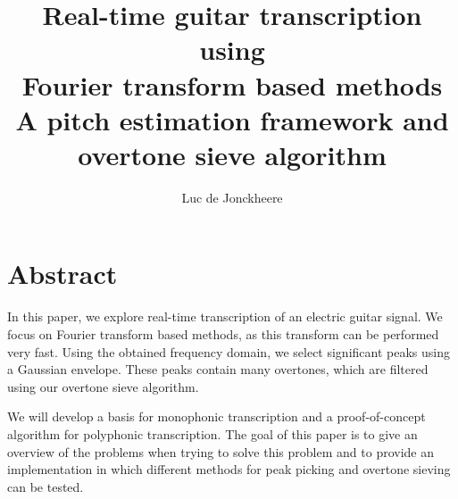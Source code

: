 \documentclass[10pt,twocolumn]{article}
\title{\textbf{Real-time guitar transcription using\\Fourier transform based methods}\\A pitch estimation framework and overtone sieve algorithm}
\author{Luc de Jonckheere}
\begin{document}

\maketitle


\section*{Abstract}
In this paper, we explore real-time transcription of an electric guitar signal. We focus on Fourier transform based methods, as this transform can be performed very fast. Using the obtained frequency domain, we select significant peaks using a Gaussian envelope. These peaks contain many overtones, which are filtered using our overtone sieve algorithm.

We will develop a basis for monophonic transcription and a proof-of-concept algorithm for polyphonic transcription. The goal of this paper is to give an overview of the problems when trying to solve this problem and to provide an implementation in which different methods for peak picking and overtone sieving can be tested.



\end{document}
